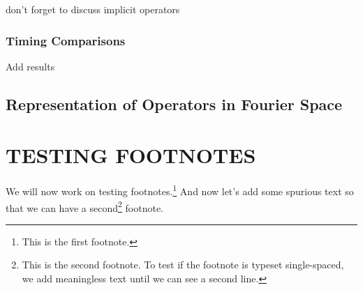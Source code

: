 \documentclass[12pt,Bold,letterpaper,TexShade]{mcgilletdclass}
\numberwithin{equation}{section}
\begin{document}
{\color{red} don't forget to discuss implicit operators}

\subsection{Timing Comparisons}
\label{sec:sf_results}

{\color{red} Add results}

\section{Representation of Operators in Fourier Space}




\chapter{TESTING FOOTNOTES}
We will now work on testing footnotes.\footnote{This is the first footnote.}
And now let's add some spurious text so that we can have a second\footnote{This
is the second footnote. To test if the footnote is typeset single-spaced, 
we add meaningless text until we can see a second line.} footnote.



	




%
%
%
%



%
\end{document}
